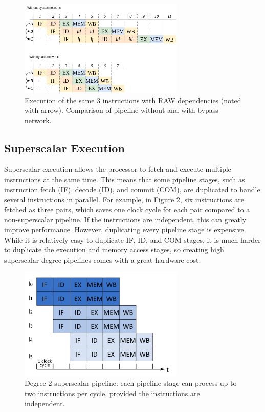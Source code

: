 \begin{figure}[H]
    \centering
    \includegraphics[width=0.7\textwidth]{figures/bypass network.png}
    \caption{Execution of the same 3 instructions with RAW dependencies (noted with arrow). Comparison of pipeline without and with bypass network.}
    \label{fig:bypass-network}
\end{figure}

\subsection{Superscalar Execution}

Superscalar execution allows the processor to fetch and execute multiple instructions at the same time. This means that some pipeline stages, such as instruction fetch (IF), decode (ID), and commit (COM), are duplicated to handle several instructions in parallel. For example, in Figure \ref{fig:superscalar}, six instructions are fetched as three pairs, which saves one clock cycle for each pair compared to a non-superscalar pipeline. If the instructions are independent, this can greatly improve performance. However, duplicating every pipeline stage is expensive. While it is relatively easy to duplicate IF, ID, and COM stages, it is much harder to duplicate the execution and memory access stages, so creating high superscalar-degree pipelines comes with a great hardware cost.

\begin{figure}[H]
    \centering
    \includegraphics[width=0.7\textwidth]{figures/multiscalar-execution.png}
    \caption{Degree 2 superscalar pipeline: each pipeline stage can process up to two instructions per cycle, provided the instructions are independent.}
    \label{fig:superscalar}
\end{figure}

